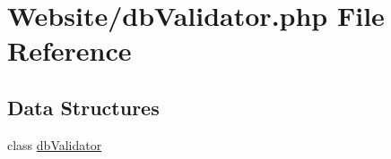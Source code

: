 \hypertarget{db_validator_8php}{\section{Website/db\-Validator.php File Reference}
\label{db_validator_8php}
}
\subsection*{Data Structures}
\begin{DoxyCompactItemize}
\item 
class \hyperlink{classdb_validator}{db\-Validator}
\end{DoxyCompactItemize}
